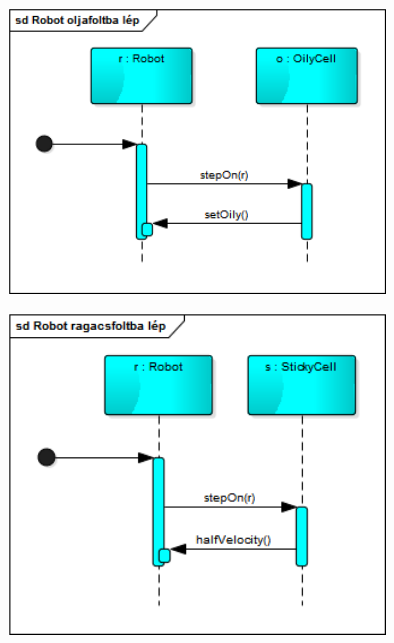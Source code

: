 \begin{figure}[!htbp]
	\begin{center}
		\includegraphics[width=100mm, center]{./chapters/chapter04/robotolajbalep.png}
		\caption{}
	\end{center}
\end{figure}

\begin{figure}[!htbp]
	\begin{center}
		\includegraphics[width=100mm, center]{./chapters/chapter04/robotragacsbalep.png}
		\caption{}
	\end{center}
\end{figure}

